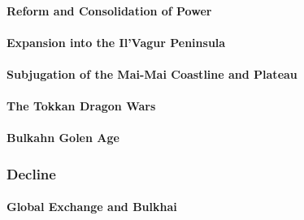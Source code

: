 		\paragraph{Reform and Consolidation of Power}
		\paragraph{Expansion into the Il'Vagur Peninsula}
		\paragraph{Subjugation of the Mai-Mai Coastline and Plateau}
		\paragraph{The Tokkan Dragon Wars}
		\paragraph{Bulkahn Golen Age}
	\subsubsection{Decline}
		\paragraph{Global Exchange and Bulkhai}
				